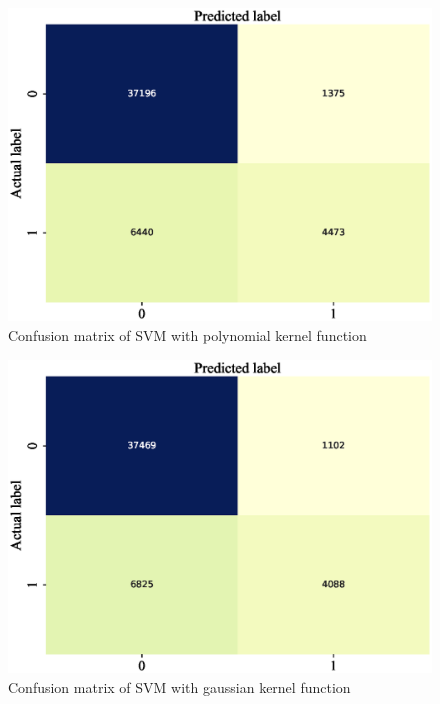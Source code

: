 \documentclass[11pt, a4paper, jou]{apa7}
\begin{document}
\begin{figure}[h]
    \centering
    \caption{Confusion matrix of SVM with polynomial kernel function}\label{fig:SVM_poly_confusion}
    \includegraphics[width=.45\textwidth]{figures/SVM_poly_confusion_matrix.eps}
\end{figure}

\begin{figure}[h]
    \centering
    \caption{Confusion matrix of SVM with gaussian kernel function}\label{fig:SVM_gauss_confusion}
    \includegraphics[width=.45\textwidth]{figures/SVM_gauss_confusion_matrix.eps}
\end{figure}

\begin{table}[h]
    \centering
    \caption{Classification results of logistic regression models on the test set. }
    \label{tab:logistic_summary}
\end{table}
\end{document}
